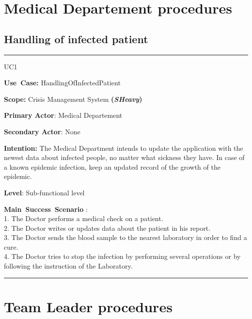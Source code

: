 \section{Medical Departement procedures}

\subsection{Handling of infected patient}
\vspace{0.5cm}
\hrule
\vspace{0.5cm}
\begin{lyxlist}{UC1}
\small{
\item [\textbf{Use~Case:}] HandlingOfInfectedPatient
\item [\textbf{Scope:}] Crisis Management System \textbf{(\emph{SHeavy})}
\item [\textbf{Primary Actor}:] Medical Departement
\item [\textbf{Secondary Actor}:] None
\item [\textbf{Intention:}]The Medical Department intends to update
the application with the newest data about infected people, no matter what
sickness they have. In case of a known epidemic infection, keep an updated
record of the growth of the epidemic.
\item [\textbf{Level}:]Sub-functional level
\item [\textbf{Main~Success~Scenario}]:\\
1. The Doctor performs a medical check on a patient.\\
2. The Doctor writes or updates data about the patient in his report.\\
3. The Doctor sends the blood sample to the nearest laboratory in order to find
a cure.\\
4. The Doctor tries to stop the infection by performing several operations or
by following the instruction of the Laboratory.\\
}
\end{lyxlist}
\hrule
\vspace{0.5cm} 

\section{Team Leader procedures}

